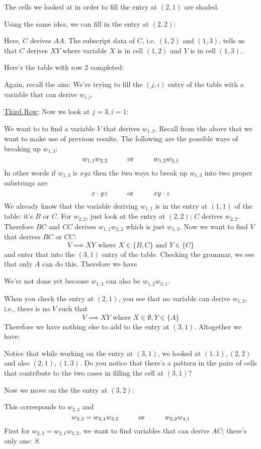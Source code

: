 The cells we looked at in order to fill the entry at $(2,1)$ are shaded.


Using the same idea, we can fill in the entry at $(2,2)$:

Here, $C$ derives $AA$.
The subscript data of $C$, i.e. $(1,2)$ and $(1,3)$, tells us that $C$
derives $XY$ where variable $X$ is in cell $(1,2)$ and
$Y$ is in cell $(1, 3)$.

Here's the table with row 2 completed:


Again, recall the aim: We're trying to fill the $(j,i)$ 
entry of the table with a variable that can derive $w_{i,j}$.

\underline{Third Row}:
Now we look at $j = 3, i = 1$:

We want to to find a variable $V$ that derives $w_{1,3}$.
Recall from the above that we want to make use of previous results.
The following are the possible ways of breaking up $w_{1,3}$:
\[
w_{1,1}w_{2,2} \hskip 1cm \text{or} \hskip 1cm w_{1,2} w_{3,1}
\]
In other words if $w_{1, 3}$ is $xyz$ then the two ways to break up 
$w_{1,3}$ into two proper substrings are:
\[
x \cdot yz \hskip 1cm \text{or} \hskip 1cm  xy \cdot z
\]
We already know that the variable deriving $w_{1,1}$ is in the
entry at $(1,1)$ of the table: it's $B$ or $C$.
For $w_{2,2}$, just look at the entry at $(2,2)$; $C$ derives 
$w_{2,2}$.
Therefore $BC$ and $CC$ derives $w_{1,1}w_{2,2}$ which is just 
$w_{1, 3}$.
Now we want to find $V$ that derives $BC$ or $CC$:
\[
  V \implies XY \text{ where } X \in \{B, C\} \text{ and } Y \in \{C\} 
\]
and enter that
into the $(3,1)$ entry of the table.
Checking the grammar, we see that only $A$ can do this.
Therefore we have

We're not done yet because $w_{1,3}$ can also be $w_{1,2} w_{3,1}$.

When you check the entry at $(2,1)$, you see that no variable can derive $w_{1,2}$, i.e.,
there is no $V$ such that
\[
  V \implies XY \text{ where } X \in \emptyset, Y \in \{A\}
\]
Therefore we have nothing else to add to the entry at $(3,1)$.
Altogether we have:


Notice that while working on the entry at $(3,1)$, we looked at 
$(1,1),(2,2)$ and also $(2,1),(1,3)$.
Do you notice that there's a pattern in the pairs of cells that
contribute to the two cases in filling the cell at $(3,1)$?


Now we move on the the entry at $(3,2)$:


This corresponds to $w_{2,3}$ and
\[
w_{2,3} = w_{2,1}w_{3,2} \hskip 1cm \text{or} \hskip 1cm w_{2,2}w_{4,1}
\] 
First for $w_{2,3} = w_{2,1}w_{3,2}$, we want to find variables that can derive
$AC$; there's only one: $S$.


